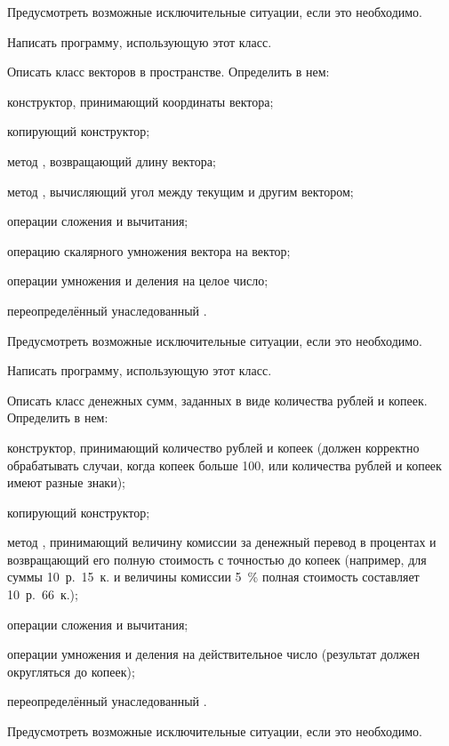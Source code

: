 Предусмотреть возможные исключительные ситуации, если это необходимо.

Написать программу, использующую этот класс.

\task Описать класс  векторов в пространстве. Определить
в нем:
\begin{itemize*}
\item конструктор, принимающий координаты вектора;
\item копирующий конструктор;
\item метод , возвращающий длину вектора;
\item метод , вычисляющий угол между текущим и другим
  вектором;
\item операции сложения и вычитания;
\item операцию скалярного умножения вектора на вектор;
\item операции умножения и деления на целое число;
\item переопределённый унаследованный .
\end{itemize*}

Предусмотреть возможные исключительные ситуации, если это необходимо.

Написать программу, использующую этот класс.

\task Описать класс  денежных сумм, заданных в виде
количества рублей и копеек.  Определить в нем:
\begin{itemize*}
\item конструктор, принимающий количество рублей и копеек (должен
  корректно обрабатывать случаи, когда копеек больше 100, или
  количества рублей и копеек имеют разные знаки);
\item копирующий конструктор;
\item метод , принимающий величину комиссии за
  денежный перевод в процентах и возвращающий его полную стоимость с
  точностью до копеек (например, для суммы 10~р.~15~к. и величины
  комиссии 5~\% полная стоимость составляет 10~р.~66~к.);
\item операции сложения и вычитания;
\item операции умножения и деления на действительное число (результат
  должен округляться до копеек);
\item переопределённый унаследованный .
\end{itemize*}

Предусмотреть возможные исключительные ситуации, если это необходимо.


